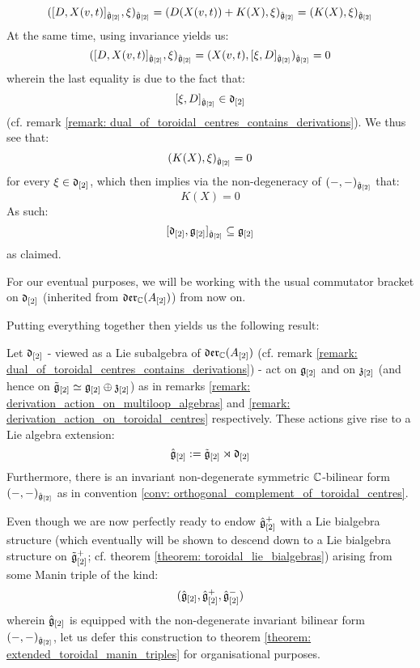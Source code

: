 \begin{remark}
                $$( [ D, X(v, t) ]_{\hat{\mathfrak{g}}_{[2]}}, \xi )_{\hat{\mathfrak{g}}_{[2]}} = (D( X(v, t) ) + K(X), \xi)_{\hat{\mathfrak{g}}_{[2]}} = (K(X), \xi)_{\hat{\mathfrak{g}}_{[2]}}$$
            At the same time, using invariance yields us:
                $$( [ D, X(v, t) ]_{\hat{\mathfrak{g}}_{[2]}}, \xi )_{\hat{\mathfrak{g}}_{[2]}} = (X(v, t), [\xi, D]_{\hat{\mathfrak{g}}_{[2]}})_{\hat{\mathfrak{g}}_{[2]}} = 0$$
            wherein the last equality is due to the fact that:
                $$[\xi, D]_{\hat{\mathfrak{g}}_{[2]}} \in \mathfrak{d}_{[2]}$$
            (cf. remark \ref{remark: dual_of_toroidal_centres_contains_derivations}). We thus see that:
                $$(K(X), \xi)_{\hat{\mathfrak{g}}_{[2]}} = 0$$
            for every $\xi \in \mathfrak{d}_{[2]}$, which then implies via the non-degeneracy of $(-, -)_{\hat{\mathfrak{g}}_{[2]}}$ that:
                $$K(X) = 0$$
            As such:
                $$[ \mathfrak{d}_{[2]}, \mathfrak{g}_{[2]} ]_{\hat{\mathfrak{g}}_{[2]}} \subseteq \mathfrak{g}_{[2]}$$
            as claimed. 
        \end{remark}

        \begin{convention}
            For our eventual purposes, we will be working with the usual commutator bracket on $\mathfrak{d}_{[2]}$ (inherited from $\mathfrak{der}_{\mathbb{C}}(A_{[2]})$) from now on.
        \end{convention}
        Putting everything together then yields us the following result:
        \begin{theorem} \label{theorem: extended_toroidal_lie_algebras}
            Let $\mathfrak{d}_{[2]}$ - viewed as a Lie subalgebra of $\mathfrak{der}_{\mathbb{C}}(A_{[2]})$ (cf. remark \ref{remark: dual_of_toroidal_centres_contains_derivations}) - act on $\mathfrak{g}_{[2]}$ and on $\mathfrak{z}_{[2]}$ (and hence on $\tilde{\mathfrak{g}}_{[2]}\simeq \mathfrak{g}_{[2]} \oplus \mathfrak{z}_{[2]}$) as in remarks \ref{remark: derivation_action_on_multiloop_algebras} and \ref{remark: derivation_action_on_toroidal_centres} respectively. These actions give rise to a Lie algebra extension:
                $$\hat{\mathfrak{g}}_{[2]} := \tilde{\mathfrak{g}}_{[2]}\rtimes \mathfrak{d}_{[2]}$$
            Furthermore, there is an invariant non-degenerate symmetric $\mathbb{C}$-bilinear form $(-, -)_{\hat{\mathfrak{g}}_{[2]}}$ as in convention \ref{conv: orthogonal_complement_of_toroidal_centres}. 
        \end{theorem}

        Even though we are now perfectly ready to endow $\hat{\mathfrak{g}}_{[2]}^+$ with a Lie bialgebra structure (which eventually will be shown to descend down to a Lie bialgebra structure on $\tilde{\mathfrak{g}}_{[2]}^+$; cf. theorem \ref{theorem: toroidal_lie_bialgebras}) arising from some Manin triple of the kind:
            $$(\hat{\mathfrak{g}}_{[2]}, \hat{\mathfrak{g}}_{[2]}^+, \hat{\mathfrak{g}}_{[2]}^-)$$
        wherein $\hat{\mathfrak{g}}_{[2]}$ is equipped with the non-degenerate invariant bilinear form $(-, -)_{\hat{\mathfrak{g}}_{[2]}}$, let us defer this construction to theorem \ref{theorem: extended_toroidal_manin_triples} for organisational purposes.